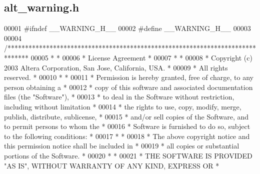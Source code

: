 \subsection{alt\+\_\+warning.\+h}
\label{alt__warning_8h_source}

\begin{DoxyCode}
00001 \textcolor{preprocessor}{#ifndef \_\_WARNING\_H\_\_}
00002 \textcolor{preprocessor}{#define \_\_WARNING\_H\_\_}
00003 
00004 \textcolor{comment}{/******************************************************************************}
00005 \textcolor{comment}{*                                                                             *}
00006 \textcolor{comment}{* License Agreement                                                           *}
00007 \textcolor{comment}{*                                                                             *}
00008 \textcolor{comment}{* Copyright (c) 2003 Altera Corporation, San Jose, California, USA.           *}
00009 \textcolor{comment}{* All rights reserved.                                                        *}
00010 \textcolor{comment}{*                                                                             *}
00011 \textcolor{comment}{* Permission is hereby granted, free of charge, to any person obtaining a     *}
00012 \textcolor{comment}{* copy of this software and associated documentation files (the "Software"),  *}
00013 \textcolor{comment}{* to deal in the Software without restriction, including without limitation   *}
00014 \textcolor{comment}{* the rights to use, copy, modify, merge, publish, distribute, sublicense,    *}
00015 \textcolor{comment}{* and/or sell copies of the Software, and to permit persons to whom the       *}
00016 \textcolor{comment}{* Software is furnished to do so, subject to the following conditions:        *}
00017 \textcolor{comment}{*                                                                             *}
00018 \textcolor{comment}{* The above copyright notice and this permission notice shall be included in  *}
00019 \textcolor{comment}{* all copies or substantial portions of the Software.                         *}
00020 \textcolor{comment}{*                                                                             *}
00021 \textcolor{comment}{* THE SOFTWARE IS PROVIDED "AS IS", WITHOUT WARRANTY OF ANY KIND, EXPRESS OR  *}

\end{DoxyCode}
